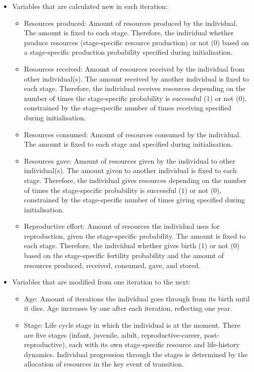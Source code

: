 \documentclass{article}
\begin{document}
\begin{itemize}
    \item Variables that are calculated new in each iteration:
    \begin{itemize}
        \item Resources produced: Amount of resources produced by the individual. The amount is fixed to each stage. Therefore, the individual whether produce resources (stage-specific resource production) or not (0) based on a stage-specific production probability specified during initialisation.
        \item Resources received: Amount of resources received by the individual from other individual(s). The amount received by another individual is fixed to each stage. Therefore, the individual receives resources depending on the number of times the stage-specific probability is successful ($1$) or not ($0$), constrained by the stage-specific number of times receiving specified during initialisation.
        \item Resources consumed: Amount of resources consumed by the individual. The amount is fixed to each stage and specified during initialisation.
        \item Resources gave: Amount of resources given by the individual to other individual(s). The amount given to another individual is fixed to each stage. Therefore, the individual gives resources depending on the number of times the stage-specific probability is successful ($1$) or not ($0$), constrained by the stage-specific number of times giving specified during initialisation.
        \item Reproductive effort: Amount of resources the individual uses for reproduction, given the stage-specific probability. The amount is fixed to each stage. Therefore, the individual whether gives birth ($1$)  or not ($0$) based on the stage-specific fertility probability and the amount of resources produced, received, consumed, gave, and stored.
    \end{itemize}
    \item Variables that are modified from one iteration to the next:
    \begin{itemize}
        \item Age: Amount of iterations the individual goes through from its birth until it dies. Age increases by one after each iteration, reflecting one year.
        \item Stage: Life cycle stage in which the individual is at the moment. There are five stages (infant, juvenile, adult, reproductive-career, post-reproductive), each with its own stage-specific resource and life-history dynamics. Individual progression through the stages is determined by the allocation of resources in the key event of transition.

\end{itemize}
\end{itemize}
\end{document}
